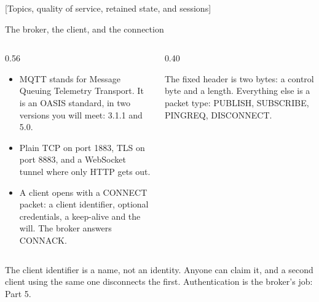 \documentclass[10pt,aspectratio=169,t]{beamer}
\begin{document}
[Topics, quality of service, retained state, and sessions]

\begin{frame}[embedded,eyebrow=MQTT]{The broker, the client, and the connection}
  \vskip 2mm
  \begin{columns}[T]
    \begin{column}{0.56\textwidth}
      \begin{itemize}
        \item MQTT stands for Message Queuing Telemetry Transport. It is an OASIS standard, in two versions you will meet: 3.1.1 and 5.0.
        \item Plain TCP on port 1883, TLS on port 8883, and a WebSocket tunnel where only HTTP gets out.
        \item A client opens with a CONNECT packet: a client identifier, optional credentials, a keep-alive and the will. The broker answers CONNACK.
      \end{itemize}
    \end{column}
    \begin{column}{0.40\textwidth}
      \begin{hint}
        The fixed header is two bytes: a control byte and a length. Everything else is a packet type: PUBLISH, SUBSCRIBE, PINGREQ, DISCONNECT.
      \end{hint}
    \end{column}
  \end{columns}
  \begin{takeaway}{The client identifier is a name, not an identity.}
    Anyone can claim it, and a second client using the same one disconnects the first. Authentication is the broker's job: Part 5.
  \end{takeaway}
\end{frame}
\end{document}
